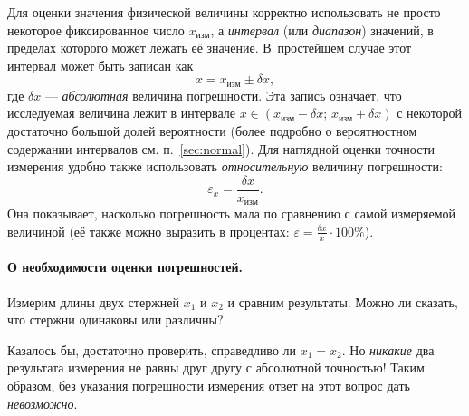 
Для оценки значения физической величины корректно использовать
не просто некоторое фиксированное число $x_{\text{изм}}$, а \emph{интервал} (или
\emph{диапазон}) значений, в пределах которого может лежать её
 значение. В~простейшем случае этот интервал
может быть записан как
\[
x=x_{\text{изм}}\pm\delta x,
\]
где $\delta x$ --- \emph{абсолютная} величина погрешности.
Эта запись означает, что исследуемая величина лежит в интервале
$x\in(x_{\text{изм}}-\delta x;\,x_{\text{изм}}+\delta x)$
с некоторой достаточно большой долей вероятности (более подробно о
вероятностном содержании интервалов см. п.~\ref{sec:normal}).
Для наглядной оценки точности измерения удобно также использовать
\emph{относительную} величину погрешности:
\[
\varepsilon_{x}=\frac{\delta x}{x_{\text{изм}}}.
\]
Она показывает, насколько погрешность мала по сравнению с
самой измеряемой величиной (её также можно выразить в процентах:
$\varepsilon=\frac{\delta x}{x}\cdot100\%$).


\paragraph{О необходимости оценки погрешностей.}

Измерим длины двух стержней $x_{1}$ и $x_{2}$ и сравним результаты.
Можно ли сказать, что стержни одинаковы или различны?

Казалось бы,
достаточно проверить, справедливо ли $x_{1}=x_{2}$. Но \emph{никакие}
два результата измерения не равны друг другу с абсолютной точностью! Таким
образом, без указания погрешности измерения ответ на этот вопрос дать
\emph{невозможно}.

